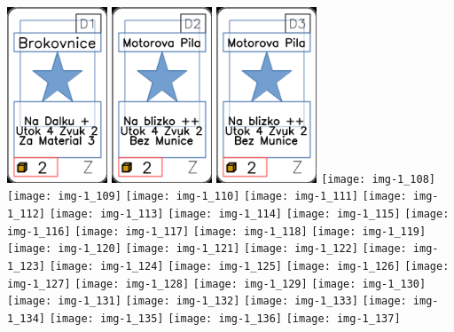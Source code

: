 \documentclass[a4paper]{article}
\begin{document}
	\includegraphics[width=3.0cm]{img-1_105}
	\includegraphics[width=3.0cm]{img-1_106}
	\includegraphics[width=3.0cm]{img-1_107}
	\texttt{[image: img-1\_108]}
	\texttt{[image: img-1\_109]}
	\texttt{[image: img-1\_110]}
	\texttt{[image: img-1\_111]}
	\texttt{[image: img-1\_112]}
	\texttt{[image: img-1\_113]}
	\texttt{[image: img-1\_114]}
	\texttt{[image: img-1\_115]}
	\texttt{[image: img-1\_116]}
	\texttt{[image: img-1\_117]}
	\texttt{[image: img-1\_118]}
	\texttt{[image: img-1\_119]}
	\texttt{[image: img-1\_120]}
	\texttt{[image: img-1\_121]}
	\texttt{[image: img-1\_122]}
	\texttt{[image: img-1\_123]}
	\texttt{[image: img-1\_124]}
	\texttt{[image: img-1\_125]}
	\texttt{[image: img-1\_126]}
	\texttt{[image: img-1\_127]}
	\texttt{[image: img-1\_128]}
	\texttt{[image: img-1\_129]}
	\texttt{[image: img-1\_130]}
	\texttt{[image: img-1\_131]}
	\texttt{[image: img-1\_132]}
	\texttt{[image: img-1\_133]}
	\texttt{[image: img-1\_134]}
	\texttt{[image: img-1\_135]}
	\texttt{[image: img-1\_136]}
	\texttt{[image: img-1\_137]}
\end{document}
